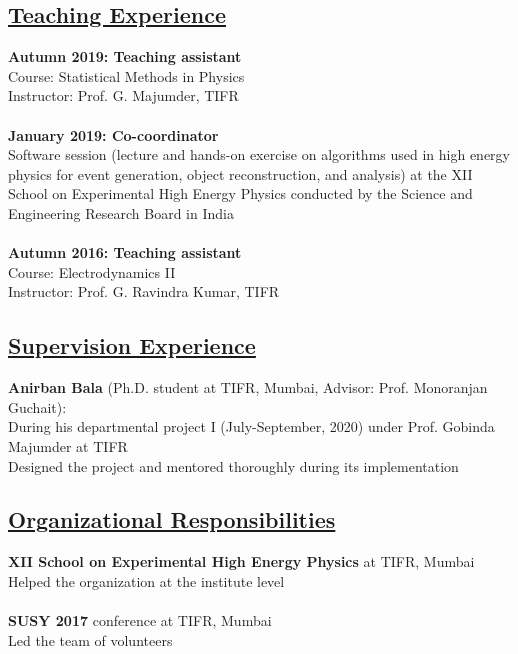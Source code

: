 \documentclass[a4paper,11pt]{article}
\begin{document}
{\subsection*{\underline{Teaching Experience}}

\textbf{Autumn 2019: Teaching assistant}\\
Course: Statistical Methods in Physics\\
Instructor: Prof. G. Majumder, TIFR\\
\\
\textbf{January 2019: Co-coordinator}\\
Software session (lecture and hands-on exercise on algorithms used in high energy physics for event generation, object reconstruction, and analysis) 
at the XII School on Experimental High Energy Physics conducted by the Science and Engineering Research Board in India \\
\\
\textbf{Autumn 2016: Teaching assistant}\\
Course: Electrodynamics II\\
Instructor: Prof. G. Ravindra Kumar, TIFR\\

\subsection*{\underline{Supervision Experience}}

\textbf{Anirban Bala} (Ph.D. student at TIFR, Mumbai, Advisor: Prof. Monoranjan Guchait):\\
During his departmental project I (July-September, 2020) under Prof. Gobinda Majumder at TIFR \\
Designed the project and mentored thoroughly during its implementation\\

\subsection*{\underline{Organizational Responsibilities}}

\textbf{XII School on Experimental High Energy Physics} at TIFR, Mumbai\\
Helped the organization at the institute level\\
\\
\textbf{SUSY 2017} conference at TIFR, Mumbai\\
Led the team of volunteers \\

}
\end{document}
